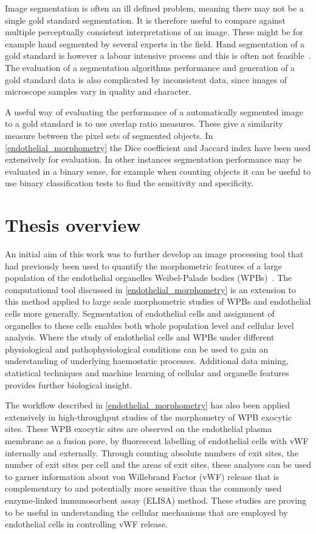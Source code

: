 Image segmentation is often an ill defined problem, meaning there may not be a single gold standard segmentation. It is therefore useful to compare against multiple perceptually consistent interpretations of an image. These might be for example hand segmented by several experts in the field. Hand segmentation of a gold standard is however a labour intensive process and this is often not feasible~\cite{Unnikrishnan2005}. The evaluation of a segmentation algorithms performance and generation of a gold standard data is also complicated by inconsistent data, since images of microscope samples vary in quality and character.

A useful way of evaluating the performance of a automatically segmented image to a gold standard is to use overlap ratio measures. These give a similarity measure between the pixel sets of segmented objects. In \autoref{endothelial_morphometry} the Dice coefficient and Jaccard index have been used extensively for evaluation. In other instances segmentation performance may be evaluated in a binary sense, for example when counting objects it can be useful to use binary classification tests to find the sensitivity and specificity.

\section{Thesis overview}
\label{introduction:overview}
An initial aim of this work was to further develop an image processing tool that had previously been used to quantify the morphometric features of a large population of the endothelial organelles Weibel-Palade bodies (WPBs)~\cite{Ferraro2014}. The computational tool discussed in \autoref{endothelial_morphometry} is an extension to this method applied to large scale morphometric studies of WPBs and endothelial cells more generally. Segmentation of endothelial cells and assignment of organelles to these cells enables both whole population level and cellular level analysis. Where the study of endothelial cells and WPBs under different physiological and pathophysiological conditions can be used to gain an understanding of underlying haemostatic processes. Additional data mining, statistical techniques and machine learning of cellular and organelle features provides further biological insight.

The workflow described in \autoref{endothelial_morphometry} has also been applied extensively in high-throughput studies of the morphometry of WPB exocytic sites. These WPB exocytic sites are observed on the endothelial plasma membrane as a fusion pore, by fluorescent labelling of endothelial cells with vWF internally and externally. Through counting absolute numbers of exit sites, the number of exit sites per cell and the areas of exit sites, these analyses can be used to garner information about von Willebrand Factor (vWF) release that is complementary to and potentially more sensitive than the commonly used enzyme-linked immunosorbent assay (ELISA) method. These studies are proving to be useful in understanding the cellular mechanisms that are employed by endothelial cells in controlling vWF release.

